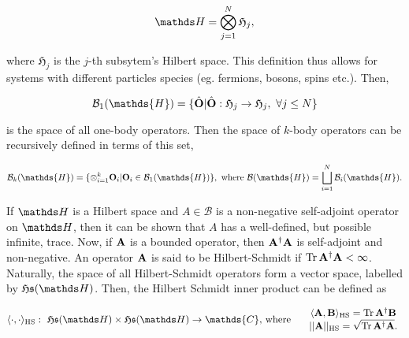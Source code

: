 \documentclass{homework}
\begin{document}
$$
    \hilbert = \bigotimes_{j=1}^{N} \mathfrak{H}_j,
$$ 

where $\mathfrak{H}_j$ is the $j$-th subsytem's Hilbert space. This definition thus allows for systems with different particles species (eg. fermions, bosons, spins etc.). Then, 

$$
\mathcal{B}_1(\mathds{H})=\{\hat{\bf O}| \hat{\bf O}:\mathfrak{H}_j \rightarrow \mathfrak{H}_j, \blanky \forall j \leq N \}
$$ 

is the space of all one-body operators. Then the
space of $k$-body operators can be recursively defined in terms of this set, 

\begin{align*}
\mathcal{B}_k(\mathds{H}) = \{\otimes_{i=1}^{k} {\bf O}_i | {\bf O}_i \in \mathcal{B}_1(\mathds{H}) \}, \textnormal{ where } \mathcal{B}(\mathds{H}) = \bigsqcup_{i=1}^{N} \mathcal{B}_i(\mathds{H}).
\end{align*}


If $\hilbert$ is a Hilbert space and $A \in \mathcal{B}$ is a non-negative self-adjoint operator on $\hilbert$, then it can be shown that $A$ has a well-defined, but possible infinite, trace. Now, if ${\bf A}$ is a bounded operator, then ${\bf A}^\dagger {\bf A}$ is self-adjoint and non-negative. An operator ${\bf A}$ is said to be Hilbert-Schmidt if $\Tr \bf A^\dagger {\bf A} < \infty$. Naturally, the space of all Hilbert-Schmidt operators form a vector space, labelled by $\mathfrak{H}\mathfrak{s}(\hilbert)$. Then, the Hilbert Schmidt inner product can be defined as 

\begin{align*}
\langle \cdot , \cdot \rangle_{\textnormal{HS}}: \blanky \mathfrak{H}\mathfrak{s}(\hilbert) \times \mathfrak{H}\mathfrak{s}(\hilbert) \rightarrow \mathds{C}, & \textnormal{ where } &
    \begin{array}{c} 
         \langle {\bf A}, {\bf B} \rangle_{\textnormal{HS}} = \Tr \bf A^\dagger {\bf B} \\
         ||{\bf A}||_{\textnormal{HS}} = \sqrt{\Tr \bf A^\dagger {\bf A}}.
    \end{array}
\end{align*}
\end{document}
